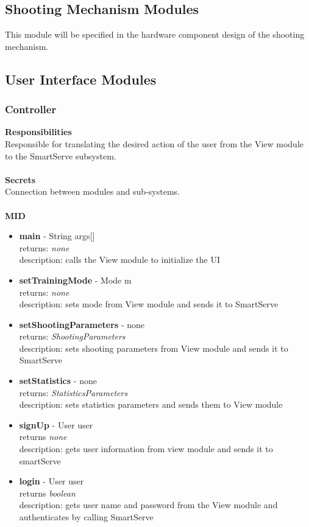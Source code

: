 \documentclass[11pt]{article}
\begin{document}
\subsection{Shooting Mechanism Modules}
This module will be specified in the hardware component design of the shooting mechanism.
\subsection{User Interface Modules}
\subsubsection*{Controller}
\textbf{Responsibilities} \\
Responsible for translating the desired action of the user from the View module to the SmartServe subsystem. \\ \\
\textbf{Secrets} \\
Connection between modules and sub-systems. \\ \\
\textbf{MID}
\begin{itemize}
\item \textbf{main} - String args[] \\ returns: \textit{none} \\ description: calls the View module to initialize the UI
\item \textbf{setTrainingMode} - Mode m \\ returns: \textit{none} \\ description: sets mode from View module and sends it to SmartServe
\item \textbf{setShootingParameters} - none \\ returns: \textit{ShootingParameters} \\ description: sets shooting parameters from View module and sends it to SmartServe
\item \textbf{setStatistics} - none \\ returns: \textit{StatisticsParameters} \\ description: sets statistics parameters and sends them to View module
\item \textbf{signUp} - User user \\ returns \textit{none} \\ description: gets user information from view module and sends it to smartServe
\item \textbf{login} - User user \\ returns \textit{boolean} \\ description: gets user name and password from the View module and authenticates by calling SmartServe
\end{itemize}
\end{document}

